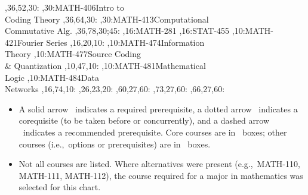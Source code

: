 \documentclass[9pt]{extarticle}
\begin{document}
\begin{chart}
  ,36,52,30:
,30:{MATH-406}{Intro to\\Coding Theory}{}
  ,36,64,30:
,30:{MATH-413}{Computational\\Commutative Alg.}{}
  ,36,78,30;45:
,16:{MATH-281}
,16:{STAT-455}
,10:{MATH-421}{Fourier Series}{}
  ,16,20,10:
,10:{MATH-474}{Information\\Theory}{}
,10:{MATH-477}{Source Coding\\\& Quantization}{}
  ,10,47,10:
,10:{MATH-481}{Mathematical\\Logic}{}
,10:{MATH-484}{Data\\Networks}{}
  ,16,74,10:
  ,26,23,20:
  ,60,27,60:
  ,73,27,60:
  ,66,27,60:
\end{chart}
\begin{center}
\begin{minipage}{6.0in}
\begin{itemize}
\item
A solid arrow \solidarrow\  indicates a required prerequisite,
a dotted arrow \dottedarrow\
indicates a corequisite (to be taken before or concurrently), and a
dashed arrow \dashedarrow\ indicates a recommended prerequisite.
Core courses are in \boldbox\ boxes;
other courses (i.e.,~options or prerequisites)
are in \lightbox\ boxes.
\item Not all courses are listed. Where alternatives were present
(e.g.,~MATH-110, MATH-111, MATH-112), the course required for a major in
mathematics was selected for this chart.
\end{itemize}
\end{minipage}
\end{center}
\end{document}
